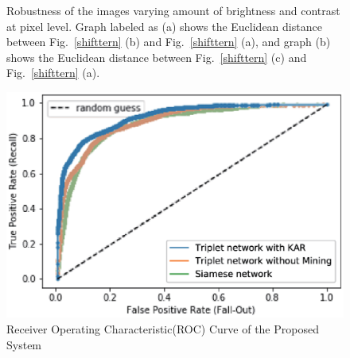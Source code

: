 \documentclass[runningheads]{llncs}
\begin{document}
\begin{figure}[!h]
   \begin{center}
   \caption{Robustness of the images varying amount of
        brightness and contrast at pixel level. Graph labeled as (a)
        shows the Euclidean distance between Fig.~\ref{shifttern}
        (b) and Fig.~\ref{shifttern} (a), and graph (b) shows the
        Euclidean distance between Fig.~\ref{shifttern} (c) and
        Fig.~\ref{shifttern} (a).}
   \label{shifttern2}
   \end{center}
\end{figure}

\iffalse
\begin{figure}[!h]
    \includegraphics[width=\textwidth]{fig_roc_v5.eps}
    \caption{Receiver Operating Characteristic(ROC) Curve of the Proposed System} \label{fig3}
\end{figure}
\end{document}
